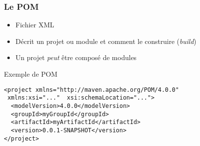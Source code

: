 \documentclass[english, french]{beamer}
\begin{document}
\begin{frame}[fragile]
	\frametitle{Le POM}
	\begin{itemize}
		\item Fichier XML
		\item Décrit un projet ou module et comment le construire (\emph{build})
		\item Un projet \emph{peut} être composé de modules
	\end{itemize}
	\begin{block}{Exemple de POM}
		\begin{lstlisting}
<project xmlns="http://maven.apache.org/POM/4.0.0"
 xmlns:xsi="..."  xsi:schemaLocation="...">
  <modelVersion>4.0.0</modelVersion>
  <groupId>myGroupId</groupId>
  <artifactId>myArtifactId</artifactId>
  <version>0.0.1-SNAPSHOT</version>
</project>
\end{lstlisting}
	\end{block}
\end{frame}
\end{document}
